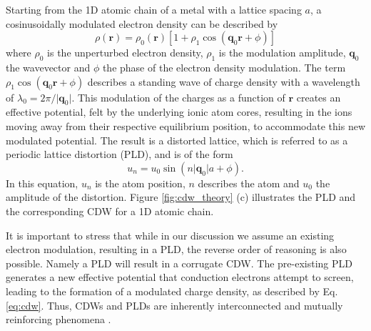 Starting from the 1D atomic chain of a metal with a lattice spacing $a$, a cosinusoidally modulated electron density can be described by
\begin{equation}
	\rho(\mathbf{r}) = \rho_0(\mathbf{r})[1+\rho_1 \cos(\mathbf{q}_0\mathbf{r}+\phi)]
	\label{eq:cdw}
\end{equation}
where $\rho_0$ is the unperturbed electron density, $\rho_1$ is the modulation amplitude, $\mathbf{q}_0$ the wavevector and $\phi$ the phase of the electron density modulation.
The term $\rho_1 \cos(\mathbf{q}_0\mathbf{r}+\phi)$ describes a standing wave of charge density with a wavelength of $\lambda_0 = 2\pi/\lvert \mathbf{q}_0\rvert$.
This modulation of the charges as a function of $\mathbf{r}$ creates an effective potential, felt by the underlying ionic atom cores, resulting in the ions moving away from their respective equilibrium position, to accommodate this new modulated potential.
The result is a distorted lattice, which is referred to as a periodic lattice distortion (PLD), and is of the form
\begin{equation}
	u_n = u_0 \sin(n\lvert \mathbf{q}_0\rvert a+\phi).
	\label{eq:pld}
\end{equation}
In this equation, $u_n$ is the atom position, $n$ describes the atom and $u_0$ the amplitude of the distortion.
Figure \ref{fig:cdw_theory} (c) illustrates the PLD and the corresponding CDW for a 1D atomic chain.

It is important to stress that while in our discussion we assume an existing electron modulation, resulting in a PLD, the reverse order of reasoning is also possible.
Namely a PLD will result in a corrugate CDW.
The pre-existing PLD generates a new effective potential that conduction electrons attempt to screen, leading to the formation of a modulated charge density, as described by Eq. \ref{eq:cdw}.
Thus, CDWs and PLDs are inherently interconnected and mutually reinforcing phenomena \cite{rossnagel_origin_2011, chan_spin_1973, johannes_fermi_2008}.


